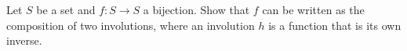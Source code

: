 \begin{problem}
    Let \( S \) be a set and \( f: S \rightarrow S \) a bijection. Show that \( f \) can be written as the composition of two involutions, where an involution \( h \) is a function that is its own inverse.
\end{problem}
